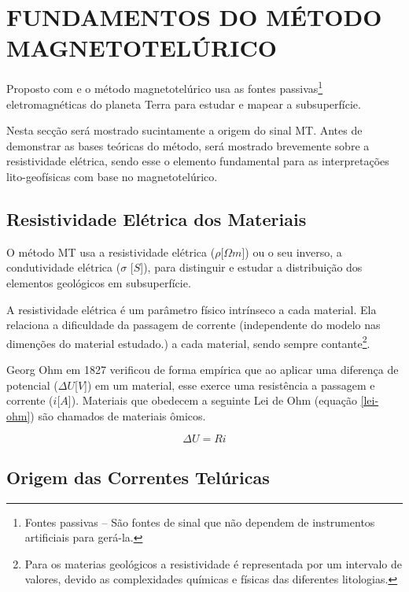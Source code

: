 \chapter{FUNDAMENTOS DO MÉTODO MAGNETOTELÚRICO}

    Proposto com \cite{tikhonov1950determining} e \cite{cagniard1953basic} o método magnetotelúrico usa as fontes passivas\footnote{Fontes passivas -- São fontes de sinal que não dependem de instrumentos artificiais para gerá-la.} eletromagnéticas do planeta Terra para estudar e mapear a subsuperfície.
    
    Nesta secção será mostrado sucintamente a origem do sinal MT. Antes de demonstrar as bases teóricas do método, será mostrado brevemente sobre a resistividade elétrica, sendo esse o elemento fundamental para as interpretações lito-geofísicas com base no magnetotelúrico.
        

    \section{Resistividade Elétrica dos Materiais}
    
        
        O método MT usa a resistividade elétrica ($\rho$[$\Omega m$]) ou o seu inverso, a condutividade elétrica ($\sigma$ [$S$]), para distinguir e estudar a distribuição dos elementos geológicos em subsuperfície. 
        
        A resistividade elétrica é um parâmetro físico intrínseco a cada material. Ela relaciona a dificuldade da passagem de corrente (independente do modelo nas dimenções do material estudado.) a cada material, sendo sempre contante\footnote{Para os materias geológicos a resistividade é representada por um intervalo de valores, devido as complexidades químicas e físicas das diferentes litologias.}.  
        
        Georg Ohm em 1827 verificou de forma empírica que ao aplicar uma diferença de potencial ($\Delta U$[$V$]) em um material, esse exerce uma resistência a passagem e corrente ($i$[$A$]). Materiais que obedecem a seguinte Lei de Ohm (equação \ref{lei-ohm}) são chamados de materiais ômicos.
        
        \begin{equation}
            \label{lei-ohm}
            \Delta U = R i
        \end{equation}
        
    
    \section{Origem das Correntes Telúricas}
    
